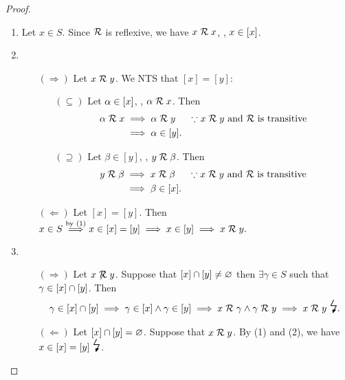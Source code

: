 \documentclass[11pt,openany]{article}
\begin{document}
\begin{proof}
	\textcolor{gray!30!white}{\begin{enumerate}[(1)]
		\item Let $x\in S$. Since $\mathcal{R}$ is reflexive, we have $x\mathrel{\mathcal{R}} x$, \ie, $x\in\left[x\right]$.
		\item \begin{itemize}
			\item[$(\Rightarrow)$] Let $x\mathrel{\mathcal{R}} y$. We NTS that $[x]=[y]$: \begin{itemize}
				\item[$(\subseteq)$] Let $\alpha\in\left[x\right]$, \ie, $\alpha\mathrel{\mathcal{R}} x$. Then 
				\begin{align*}
					\alpha\mathrel{\mathcal{R}} x&\implies \alpha\mathrel{\mathcal{R}} y&\because\text{$x\mathrel{\mathcal{R}} y$ and $\mathcal{R}$ is transitive} \\
					&\implies \alpha\in[y].
				\end{align*}
				\item[$(\supseteq)$] Let $\beta\in[y]$, \ie, $y\mathrel{\mathcal{R}}\beta$. Then 
				\begin{align*}
					y\mathrel{\mathcal{R}}\beta&\implies x\mathrel{\mathcal{R}} \beta&\because\text{$x\mathrel{\mathcal{R}} y$ and $\mathcal{R}$ is transitive} \\
					&\implies \beta\in[x].
				\end{align*}
			\end{itemize}
			\item[$(\Leftarrow)$] Let $[x]=[y]$. Then $
			x\in S\overset{\text{by (1)}}{\implies} x\in[x]=[y]\implies x\in[y]\implies x\mathrel{\mathcal{R}} y.$
		\end{itemize}
		\item \begin{itemize}
			\item[$(\Rightarrow)$] Let $x\centernot\relation y$. Suppose that $\left[x\right]\cap[y]\neq\varnothing$ then $\exists \gamma\in S$ such that $\gamma\in\left[x\right]\cap[y]$. Then \begin{align*}
				\gamma\in [x]\cap [y]\implies \gamma\in [x]\land\gamma\in [y]\implies x\relation\gamma\land \gamma\relation y\implies x\relation y\ \text{\LARGE\lightning}.
			\end{align*}
			\item[$(\Leftarrow)$] Let $\left[x\right]\cap[y]=\varnothing$. Suppose that $x\mathrel{\mathcal{R}} y$. By (1) and (2), we have $x\in[x]=[y]\ \text{\LARGE\lightning}$.
		\end{itemize}
	\end{enumerate}}
\end{proof}
\end{document}
